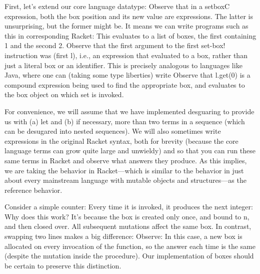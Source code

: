 First, let’s extend our core language datatype:
Observe that in a setboxC expression, both the box position and its new value
are expressions. The latter is unsurprising, but the former might be. It means
we can write programs such as this in corresponding Racket:
This evaluates to a list of boxes, the first containing 1 and the second 2.
Observe that the first argument to the first set-box! instruction was (first l),
i.e., an expression that evaluated to a box, rather than just a literal box or
an identifier. This is precisely analogous to languages like Java, where one can
(taking some type liberties) write
Observe that l.get(0) is a compound expression being used to find the
appropriate box, and evaluates to the box object on which set is invoked.

For convenience, we will assume that we have implemented desguaring to provide
us with (a) let and (b) if necessary, more than two terms in a sequence (which
can be desugared into nested sequences). We will also sometimes write
expressions in the original Racket syntax, both for brevity (because the core
language terms can grow quite large and unwieldy) and so that you can run these
same terms in Racket and observe what answers they produce. As this implies, we
are taking the behavior in Racket—which is similar to the behavior in just about
every mainstream language with mutable objects and structures—as the reference
behavior.


Consider a simple counter:
Every time it is invoked, it produces the next integer:
Why does this work? It’s because the box is created only once, and bound to n,
and then closed over. All subsequent mutations affect the same box. In contrast,
swapping two lines makes a big difference:
Observe:
In this case, a new box is allocated on every invocation of the function, so the
answer each time is the same (despite the mutation inside the procedure). Our
implementation of boxes should be certain to preserve this distinction.

